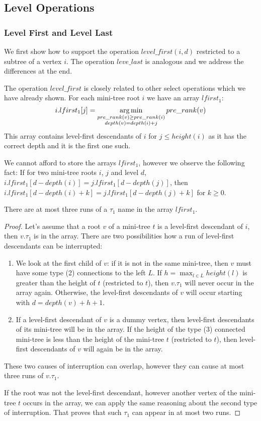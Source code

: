 \subsection{Level Operations}

\subsubsection{Level First and Level Last}

We first show how to support the operation $level\_first(i, d)$ restricted to a subtree of a vertex $i$.
The operation $leve\_last$ is analogous and we address the differences at the end.

The operation $level\_first$ is closely related to other select operations which we have already shown.
For each mini-tree root $i$ we have an array $lfirst_1$:
$$ i.lfirst_1[j] = \operatorname*{arg\,min}_{\substack{pre\_rank(v) \ge pre\_rank(i) \\ depth(v) = depth(i) + j}} pre\_rank(v) $$
This array contains level-first descendants of $i$ for $j \le height(i)$ as it has the correct depth and it is the first one such.

We cannot afford to store the arrays $lfirst_1$, however we observe the following fact:
If for two mini-tree roots $i$, $j$ and level $d$, $i.lfirst_1[d - depth(i)] = j.lfirst_1[d - depth(j)]$, then $i.lfirst_1[d - depth(i) + k] = j.lfirst_1[d - depth(j) + k]$ for $k \ge 0$.

\begin{lemma}\label{l:level-first-3}
	There are at most three runs of a $\tau_1$ name in the array $lfirst_1$.
\end{lemma}
\begin{proof}
	Let's assume that a root $v$ of a mini-tree $t$ is a level-first descendant of $i$, then $v.\tau_1$ is in the array.
	There are two possibilities how a run of level-first descendants can be interrupted:
	\begin{enumerate}
		\item We look at the first child of $v$: if it is not in the same mini-tree, then $v$ must have some type (2) connections to the left $L$.
		If $h = \max_{l \in L} height(l)$ is greater than the height of $t$ (restricted to $t$), then $v.\tau_1$ will never occur in the array again.
		Otherwise, the level-first descendants of $v$ will occur starting with $d = depth(v) + h + 1$.
		\item If a level-first descendant of $v$ is a dummy vertex, then level-first descendants of its mini-tree will be in the array.
		If the height of the type (3) connected mini-tree is less than the height of the mini-tree $t$ (restricted to $t$), then level-first descendants of $v$ will again be in the array.
	\end{enumerate}
	These two causes of interruption can overlap, however they can cause at most three runs of $v.\tau_1$.
	
	If the root was not the level-first descendant, however another vertex of the mini-tree $t$ occurs in the array, we can apply the same reasoning about the second type of interruption.
	That proves that such $\tau_1$ can appear in at most two runs.
\end{proof}

